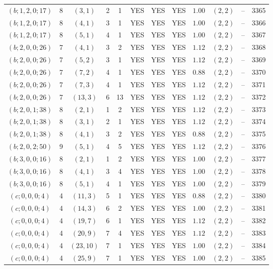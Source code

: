 \begin{longtable}{|c|c|c|c|c|c|c|c|c|c|c|c|}
$(b;1,2,0;17)$ & 8 & $(3,1)$ & 2 & 1 & YES & YES & YES & $1.00$ & $(2,2)$ & -- & 3365\\
$(b;1,2,0;17)$ & 8 & $(4,1)$ & 3 & 1 & YES & YES & YES & $1.00$ & $(2,2)$ & -- & 3366\\
$(b;1,2,0;17)$ & 8 & $(5,1)$ & 4 & 1 & YES & YES & YES & $1.00$ & $(2,2)$ & -- & 3367\\
$(b;2,0,0;26)$ & 7 & $(4,1)$ & 3 & 2 & YES & YES & YES & $1.12$ & $(2,2)$ & -- & 3368\\
$(b;2,0,0;26)$ & 7 & $(5,2)$ & 3 & 1 & YES & YES & YES & $1.12$ & $(2,2)$ & -- & 3369\\
$(b;2,0,0;26)$ & 7 & $(7,2)$ & 4 & 1 & YES & YES & YES & $0.88$ & $(2,2)$ & -- & 3370\\
$(b;2,0,0;26)$ & 7 & $(7,3)$ & 4 & 1 & YES & YES & YES & $1.12$ & $(2,2)$ & -- & 3371\\
$(b;2,0,0;26)$ & 7 & $(13,3)$ & 6 & 13 & YES & YES & YES & $1.12$ & $(2,2)$ & -- & 3372\\
$(b;2,0,1;38)$ & 8 & $(2,1)$ & 1 & 2 & YES & YES & YES & $1.12$ & $(2,2)$ & -- & 3373\\
$(b;2,0,1;38)$ & 8 & $(3,1)$ & 2 & 1 & YES & YES & YES & $1.12$ & $(2,2)$ & -- & 3374\\
$(b;2,0,1;38)$ & 8 & $(4,1)$ & 3 & 2 & YES & YES & YES & $0.88$ & $(2,2)$ & -- & 3375\\
$(b;2,0,2;50)$ & 9 & $(5,1)$ & 4 & 5 & YES & YES & YES & $1.12$ & $(2,2)$ & -- & 3376\\
$(b;3,0,0;16)$ & 8 & $(2,1)$ & 1 & 2 & YES & YES & YES & $1.00$ & $(2,2)$ & -- & 3377\\
$(b;3,0,0;16)$ & 8 & $(4,1)$ & 3 & 4 & YES & YES & YES & $1.00$ & $(2,2)$ & -- & 3378\\
$(b;3,0,0;16)$ & 8 & $(5,1)$ & 4 & 1 & YES & YES & YES & $1.00$ & $(2,2)$ & -- & 3379\\
$(c;0,0,0;4)$ & 4 & $(11,3)$ & 5 & 1 & YES & YES & YES & $0.88$ & $(2,2)$ & -- & 3380\\
$(c;0,0,0;4)$ & 4 & $(14,3)$ & 6 & 2 & YES & YES & YES & $1.00$ & $(2,2)$ & -- & 3381\\
$(c;0,0,0;4)$ & 4 & $(19,7)$ & 6 & 1 & YES & YES & YES & $1.12$ & $(2,2)$ & -- & 3382\\
$(c;0,0,0;4)$ & 4 & $(20,9)$ & 7 & 4 & YES & YES & YES & $1.12$ & $(2,2)$ & -- & 3383\\
$(c;0,0,0;4)$ & 4 & $(23,10)$ & 7 & 1 & YES & YES & YES & $1.00$ & $(2,2)$ & -- & 3384\\
$(c;0,0,0;4)$ & 4 & $(25,9)$ & 7 & 1 & YES & YES & YES & $1.00$ & $(2,2)$ & -- & 3385\\

\end{longtable}
